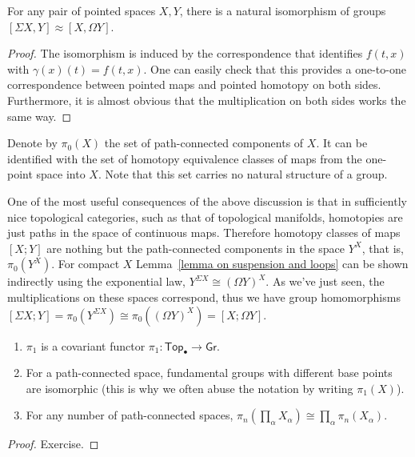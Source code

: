 \begin{lem}\label{lemma on suspension and loops}
    For any pair of pointed spaces $X,Y$, there is a natural isomorphism of groups $[\Sigma X,Y]\approx [X,\Omega Y]$.
\end{lem}
\begin{proof}
    The isomorphism is induced by the correspondence that identifies $f(t,x)$ with $\gamma(x)(t)=f(t,x)$. One can easily check that this provides a one-to-one correspondence between pointed maps and pointed homotopy on both sides. Furthermore, it is almost obvious that the multiplication on both sides works the same way.
\end{proof}

\begin{defn}
    Denote by $\pi_0(X)$ the set of path-connected components of $X$. It can be identified with the set of homotopy equivalence classes of maps from the one-point space into $X$. Note that this set carries no natural structure of a group.
\end{defn}

\begin{rem}
    One of the most useful consequences of the above discussion is that in sufficiently nice topological categories, such as that of topological manifolds, homotopies are just paths in the space of continuous maps. Therefore homotopy classes of maps $[X;Y]$ are nothing but the path-connected components in the space $Y^X$, that is, $\pi_0( Y^X)$. For compact $X$ Lemma~\ref{lemma on suspension and loops} can be shown indirectly using the exponential law, $Y^{\Sigma X}\cong (\Omega Y)^X$. As we've just seen, the multiplications on these spaces correspond, thus we have group homomorphisms $[\Sigma X;Y]= \pi_0(Y^{\Sigma X})\cong \pi_0((\Omega Y)^X)= [X;\Omega Y]$.
\end{rem}
\begin{prop}\label{prop computing pi1}
\begin{enumerate}
    \item $\pi_1$ is a covariant functor $\pi_1:\mathsf{Top}_\bullet\to \mathsf{Gr}$.
    \item For a path-connected space, fundamental groups with different base points are isomorphic (this is why we often abuse the notation by writing $\pi_1(X)$).
    \item For any number of path-connected spaces, $\pi_n(\prod_\alpha X_\alpha)\cong \prod_\alpha \pi_n(X_\alpha)$.
\end{enumerate}
\end{prop}
\begin{proof}
Exercise.
\end{proof}

